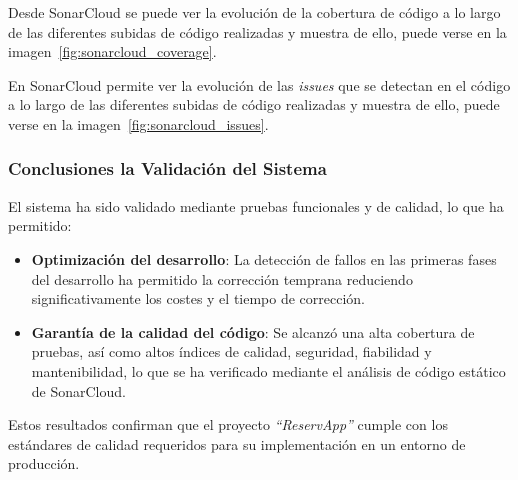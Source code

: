 

Desde SonarCloud se puede ver la evolución de la cobertura de código a lo largo de las diferentes subidas de código realizadas y muestra de ello, puede verse en la imagen~\ref{fig:sonarcloud_coverage}.


En SonarCloud permite ver la evolución de las \emph{issues} que se detectan en el código a lo largo de las diferentes subidas de código realizadas y muestra de ello, puede verse en la imagen~\ref{fig:sonarcloud_issues}.


\subsubsection{Conclusiones la Validación del Sistema}
El sistema ha sido validado mediante pruebas funcionales y de calidad, lo que ha permitido:
\begin{itemize}
   \item \textbf{Optimización del desarrollo}: La detección de fallos en las primeras fases del desarrollo ha permitido la corrección temprana reduciendo significativamente los costes y el tiempo de corrección.
   \item \textbf{Garantía de la calidad del código}: Se alcanzó una alta cobertura de pruebas, así como altos índices de calidad, seguridad, fiabilidad y mantenibilidad, lo que se ha verificado mediante el análisis de código estático de SonarCloud.
\end{itemize}

Estos resultados confirman que el proyecto \textit{``ReservApp''} cumple con los estándares de calidad requeridos para su implementación en un entorno de producción.